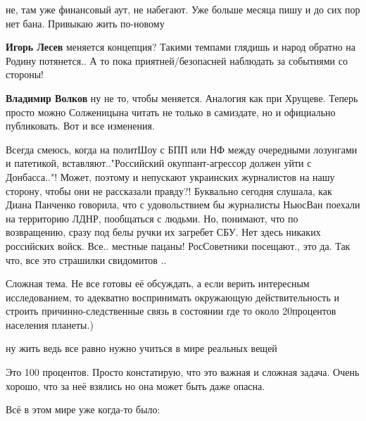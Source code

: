 \begin{itemize}
\begin{itemize} %
не, там уже финансовый аут, не набегают. Уже больше месяца пишу и до сих пор нет бана. Привыкаю жить по-новому

\textbf{Игорь Лесев} меняется концепция? Такими темпами глядишь и народ обратно на Родину потянется..
А то пока приятней/безопасней наблюдать за событиями со стороны!

\textbf{Владимир Волков} ну не то, чтобы меняется. Аналогия как при Хрущеве. Теперь просто можно Солженицына читать не только в самиздате, но и официально публиковать. Вот и все изменения.


Всегда смеюсь, когда на политШоу с БПП или НФ между очередными лозунгами и
патетикой, вставляют.."Российский окуппант-агрессор должен уйти с Донбасса.."!
Может, поэтому и непускают украинских журналистов на нашу сторону, чтобы они не
рассказали правду?! Буквально сегодня слушала, как Диана Панченко говорила, что
с удовольствием бы журналисты НьюсВан поехали на территорию ЛДНР, пообщаться с
людьми. Но, понимают, что по возвращению, сразу под белы ручки их загребет СБУ.
Нет здесь никаких российских войск. Все.. местные пацаны! РосСоветники
посещают., это да. Так что, все это страшилки свидомитов ..

\end{itemize} %


Сложная тема. Не все готовы её обсуждать, а если верить интересным
исследованием, то адекватно воспринимать окружающую действительность и строить
причинно-следственные связь в состоянии где то около 20процентов населения
планеты.)

\begin{itemize} %
ну жить ведь все равно нужно учиться в мире реальных вещей

Это 100 процентов.
Просто констатирую, что это важная и сложная задача. Очень хорошо, что за неё взялись но она может быть даже опасна.
\end{itemize} %


Всё в этом мире уже когда-то было:


\end{itemize}
